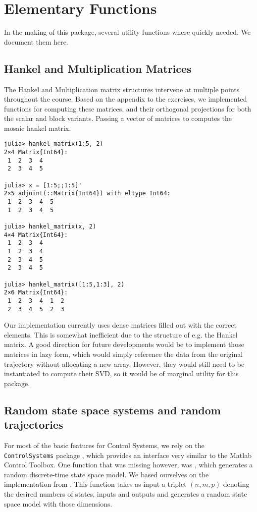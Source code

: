 \documentclass[11pt]{article}
\begin{document}
\section{Elementary Functions}
In the making of this package, several utility functions where quickly needed. We document them here.
\subsection*{Hankel and Multiplication Matrices}
The Hankel and Multiplication matrix structures intervene at multiple points throughout the course. Based on the appendix to the exercises, we implemented functions for computing these matrices, and their orthogonal projections for both the scalar and block variants. Passing a vector of matrices to  computes the mosaic hankel matrix.

\begin{codebox}
\begin{verbatim}
julia> hankel_matrix(1:5, 2)
2×4 Matrix{Int64}:
 1  2  3  4
 2  3  4  5

julia> x = [1:5;;1:5]'
2×5 adjoint(::Matrix{Int64}) with eltype Int64:
 1  2  3  4  5
 1  2  3  4  5

julia> hankel_matrix(x, 2)
4×4 Matrix{Int64}:
 1  2  3  4
 1  2  3  4
 2  3  4  5
 2  3  4  5

julia> hankel_matrix([1:5,1:3], 2)
2×6 Matrix{Int64}:
 1  2  3  4  1  2
 2  3  4  5  2  3 
\end{verbatim}
\end{codebox}

Our implementation currently uses dense matrices filled out with the correct elements. This is somewhat inefficient due to the structure of e.g. the Hankel matrix. A good direction for future developments would be to implement those matrices in lazy form, which would simply reference the data from the original trajectory without allocating a new array. However, they would still need to be instantiated to compute their SVD, so it would be of marginal utility for this package.

\subsection*{Random state space systems and random trajectories}
For most of the basic features for Control Systems, we rely on the \texttt{ControlSystems} package \cite{controlsystems_jl}, which provides an interface very similar to the Matlab Control Toolbox. One function that was missing however, was , which generates a random discrete-time state space model. We based ourselves on the implementation from \cite{python-control}. This function takes as input a triplet $(n,m,p)$ denoting the desired numbers of states, inputs and outputs and generates a random state space model with those dimensions.
\end{document}
